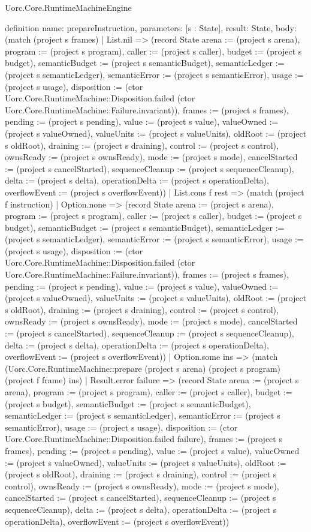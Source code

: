 \begin{lexlean}{Uorc.Core.RuntimeMachineEngine}
\begin{semanticmodule}
definition{
  name: prepareInstruction,
  parameters: [s : State],
  result: State,
  body: (match (project s frames)
    | List.nil => (record State {arena := (project s arena), program := (project s program), caller := (project s caller), budget := (project s budget), semanticBudget := (project s semanticBudget), semanticLedger := (project s semanticLedger), semanticError := (project s semanticError), usage := (project s usage), disposition := (ctor Uorc.Core.RuntimeMachine::Disposition.failed (ctor Uorc.Core.RuntimeMachine::Failure.invariant)), frames := (project s frames), pending := (project s pending), value := (project s value), valueOwned := (project s valueOwned), valueUnits := (project s valueUnits), oldRoot := (project s oldRoot), draining := (project s draining), control := (project s control), ownsReady := (project s ownsReady), mode := (project s mode), cancelStarted := (project s cancelStarted), sequenceCleanup := (project s sequenceCleanup), delta := (project s delta), operationDelta := (project s operationDelta), overflowEvent := (project s overflowEvent)})
    | List.cons f rest => (match (project f instruction)
      | Option.none => (record State {arena := (project s arena), program := (project s program), caller := (project s caller), budget := (project s budget), semanticBudget := (project s semanticBudget), semanticLedger := (project s semanticLedger), semanticError := (project s semanticError), usage := (project s usage), disposition := (ctor Uorc.Core.RuntimeMachine::Disposition.failed (ctor Uorc.Core.RuntimeMachine::Failure.invariant)), frames := (project s frames), pending := (project s pending), value := (project s value), valueOwned := (project s valueOwned), valueUnits := (project s valueUnits), oldRoot := (project s oldRoot), draining := (project s draining), control := (project s control), ownsReady := (project s ownsReady), mode := (project s mode), cancelStarted := (project s cancelStarted), sequenceCleanup := (project s sequenceCleanup), delta := (project s delta), operationDelta := (project s operationDelta), overflowEvent := (project s overflowEvent)})
      | Option.some ins => (match (Uorc.Core.RuntimeMachine::prepare (project s arena) (project s program) (project f frame) ins)
        | Result.error failure => (record State {arena := (project s arena), program := (project s program), caller := (project s caller), budget := (project s budget), semanticBudget := (project s semanticBudget), semanticLedger := (project s semanticLedger), semanticError := (project s semanticError), usage := (project s usage), disposition := (ctor Uorc.Core.RuntimeMachine::Disposition.failed failure), frames := (project s frames), pending := (project s pending), value := (project s value), valueOwned := (project s valueOwned), valueUnits := (project s valueUnits), oldRoot := (project s oldRoot), draining := (project s draining), control := (project s control), ownsReady := (project s ownsReady), mode := (project s mode), cancelStarted := (project s cancelStarted), sequenceCleanup := (project s sequenceCleanup), delta := (project s delta), operationDelta := (project s operationDelta), overflowEvent := (project s overflowEvent)})
}
\end{semanticmodule}
\end{lexlean}
